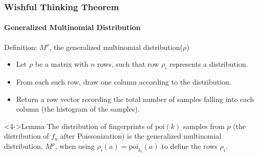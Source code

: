 \documentclass{beamer}
\begin{document}
\begin{frame}
  \frametitle{Wishful Thinking Theorem} \framesubtitle{Generalized
    Multinomial Distribution}
  \begin{block}{Definition: $M^\rho$, the generalized multinomial
      distribution($\rho$)}
  
    \begin{itemize}
    \item<1-> Let $\rho$ be a matrix with $n$ rows, such that row
      $\rho_i$ represents a distribution.
    \item<2-> From each such row, draw one column according to the
      distribution.
    \item<3-> Return a row vector recording the total number of
      samples falling into each column (the histogram of the samples).
    \end{itemize}
  \end{block}

  \begin{block}<4->{Lemma} The distribution of fingerprints of
    $\mbox{poi}(k)$ samples from $p$ (the distribution of $f_a$ after
    Poissonization) is the generalized multinomial distribution,
    $M^\rho$, when using $\rho_i(a)=\mbox{poi}_{k_i}(a)$ to define the
    rows $\rho_i$.
  \end{block}
\end{frame}
\end{document}
